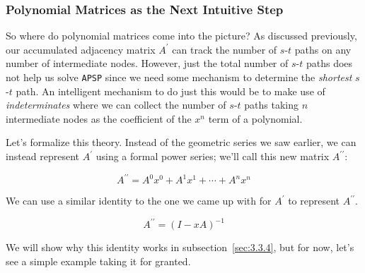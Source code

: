 \documentclass[12pt]{article}
\begin{document}
\subsubsection{Polynomial Matrices as the Next Intuitive Step} \label{sec:3.3.3}

So where do polynomial matrices come into the picture? As discussed previously, our accumulated adjacency matrix $A^{\prime}$ can track the number of $s$-$t$ paths on any number of intermediate nodes. However, just the total number of $s$-$t$ paths does not help us solve \texttt{APSP} since we need some mechanism to determine the \emph{shortest} $s$-$t$ path. An intelligent mechanism to do just this would be to make use of \emph{indeterminates} where we can collect the number of $s$-$t$ paths taking $n$ intermediate nodes as the coefficient of the $x^n$ term of a polynomial.

Let's formalize this theory. Instead of the geometric series we saw earlier, we can instead represent $A^{\prime}$ using a formal power series; we'll call this new matrix $A^{\prime \prime}$:

\[
    A^{\prime \prime} = A^0 x^0 + A^1 x^1 + \cdots + A^n x^n
\]

We can use a similar identity to the one we came up with for $A^{\prime}$ to represent $A^{\prime \prime}$.

\[
    A^{\prime \prime} = (I - xA)^{-1}
\]

We will show why this identity works in subsection~\ref{sec:3.3.4}, but for now, let's see a simple example taking it for granted.
\end{document}
